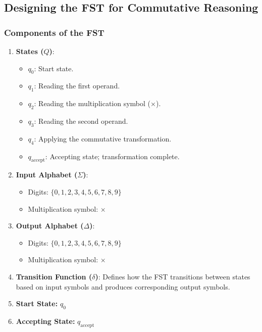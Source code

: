 \documentclass[11pt]{article}
\begin{document}
\subsection*{Designing the FST for Commutative Reasoning}

\subsubsection*{Components of the FST}
\begin{enumerate}
    \item \textbf{States (\( Q \))}:
    \begin{itemize}
        \item \( q_0 \): Start state.
        \item \( q_1 \): Reading the first operand.
        \item \( q_2 \): Reading the multiplication symbol (\( \times \)).
        \item \( q_3 \): Reading the second operand.
        \item \( q_4 \): Applying the commutative transformation.
        \item \( q_{\text{accept}} \): Accepting state; transformation complete.
    \end{itemize}
    \item \textbf{Input Alphabet (\( \Sigma \))}:
    \begin{itemize}
        \item Digits: \( \{0,1,2,3,4,5,6,7,8,9\} \)
        \item Multiplication symbol: \( \times \)
    \end{itemize}
    \item \textbf{Output Alphabet (\( \Delta \))}:
    \begin{itemize}
        \item Digits: \( \{0,1,2,3,4,5,6,7,8,9\} \)
        \item Multiplication symbol: \( \times \)
    \end{itemize}
    \item \textbf{Transition Function (\( \delta \))}:  
    Defines how the FST transitions between states based on input symbols and produces corresponding output symbols.
    \item \textbf{Start State:} \( q_0 \)
    \item \textbf{Accepting State:} \( q_{\text{accept}} \)
\end{enumerate}
\end{document}
